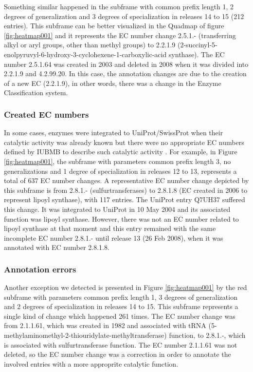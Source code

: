 Something similar happened in the subframe with common prefix length 1, 2 degrees of generalization and 3 degrees of specialization in releases 14 to 15 (212 entries). This subframe can be better visualized in the Quadmap of figure \ref{fig:heatmap001} and it represents the EC number change 2.5.1.- (transferring alkyl or aryl groups, other than methyl groups) to 2.2.1.9 (2-succinyl-5-enolpyruvyl-6-hydroxy-3-cyclohexene-1-carboxylic-acid synthase). The EC number 2.5.1.64 was created in 2003 and deleted in 2008 when it was divided into 2.2.1.9 and 4.2.99.20. In this case, the annotation changes are due to the creation of a new EC (2.2.1.9), in other words, there was a change in the Enzyme Classification system.

\subsubsection{Created EC numbers}

In some cases, enzymes were integrated to UniProt/SwissProt when their catalytic activity was already known but there were no appropriate EC numbers defined by IUBMB to describe such catalytic activity . For example, in Figure \ref{fig:heatmap001}, the subframe with parameters common prefix length 3, no generalizations and 1 degree of specialization in releases 12 to 13, represents a total of 637 EC number changes. A representative EC number change depicted by this subframe is from 2.8.1.- (sulfurtransferases) to 2.8.1.8 (EC created in 2006 to represent lipoyl synthase), with 117 entries. The UniProt entry Q7UH37 suffered this change. It was integrated to UniProt in 10 May 2004 and its associated function was lipoyl synthase. However, there was not an EC number related to lipoyl synthase at that moment and this entry remained with the same incomplete EC number 2.8.1.- until release 13 (26 Feb 2008), when it was annotated with EC number 2.8.1.8.

\subsubsection{Annotation errors}

Another exception we detected is presented in Figure \ref{fig:heatmap001} by the red subframe with parameters common prefix length 1, 3 degrees of generalization and 2 degrees of specialization in releases 14 to 15. This subframe represents a single kind of change which happened 261 times. The EC number change was from 2.1.1.61, which was created in 1982 and associated with tRNA (5-methylaminomethyl-2-thiouridylate-methyltransferase) function, to 2.8.1.-, which is associated with sulfurtransferase function. The EC number 2.1.1.61 was not deleted, so the EC number change was a correction in order to annotate the involved entries with a more approprite catalytic function.




